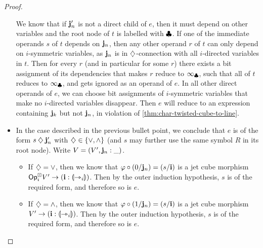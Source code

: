 \documentclass[a4paper]{article}
\begin{document}
\begin{proof}
\begin{itemize}
		We know that if $\mathbf{j}'_n$ is not a direct child of $e$, then it must depend on other variables and the root node of $t$ is labelled with $\mathbin{\clubsuit}$.
		If one of the immediate operands $s$ of $t$ depends on $\mathbf{j}_n$,
		then any other operand $r$ of $t$ can only depend on $i$-symmetric variables, as $\mathbf{j}_n$ is in $\mathbin{\diamondsuit}$-connection with all $i$-directed variables in $t$.
		Then for every $r$ (and in particular for some $r$) there exists a bit assignment of its dependencies that makes $r$ reduce to $\infty_{\mathbin{\clubsuit}}$, such that all of $t$ reduces to $\infty_{\mathbin{\clubsuit}}$, and gets ignored as an operand of $e$.
		In all other direct operands of $e$, we can choose bit assignments of $i$-symmetric variables that make no $i$-directed variables disappear.
		Then $e$ will reduce to an expression containing $\mathbf{j}_k$ but not $\mathbf{j}_n$, in violation of \cref{thm:char-twisted-cube-to-line}.
		
%		
%		
		
		\item In the case described in the previous bullet point, we conclude that $e$ is of the form $s \mathbin{\diamondsuit} \mathbf{j}_n'$ with ${\mathbin{\diamondsuit}} \in \mathopen{}\left\{ {\vee}, {\wedge} \right\}\mathclose{}$ (and $s$ may further use the same symbol $R$ in its root node).
		Write $V = (V', \mathbf{j}_n : \_)$.
		\begin{itemize}
			\item If $\mathbin{\diamondsuit} = \vee$, then we know that $\varphi \circ (0/\mathbf{j}_n) = (s/\mathbf{i})$ is a jet cube morphism ${\mathsf{Op}}^\boxdot_i V' \to (\mathbf{i} : {\llparenthesis \rightarrowtriangle_i \rrparenthesis})$.
			Then by the outer induction hypothesis, $s$ is of the required form, and therefore so is $e$.
			\item If $\mathbin{\diamondsuit} = \wedge$, then we know that $\varphi \circ (1/\mathbf{j}_n) = (s/\mathbf{i})$ is a jet cube morphism $V' \to (\mathbf{i} : {\llparenthesis \rightarrowtriangle_i \rrparenthesis})$.
			Then by the outer induction hypothesis, $s$ is of the required form, and therefore so is $e$.
		\end{itemize}
		

\end{itemize}
\end{proof}
\end{document}

